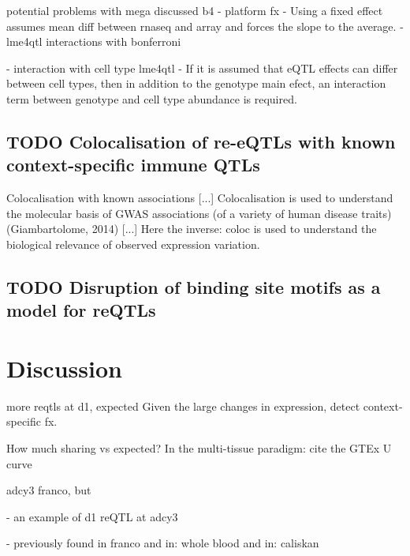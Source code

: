 potential problems with mega discussed b4
- platform fx
- Using a fixed effect assumes mean diff between rnaseq and array and forces the slope to the average.
- lme4qtl interactions with bonferroni

- interaction with cell type lme4qtl
- If it is assumed that eQTL effects can differ between cell types, then in addition to the genotype main efect, an interaction term between genotype and cell type abundance is required.


\subsection{TODO Colocalisation of re-eQTLs with known context-specific immune QTLs}

Colocalisation with known associations [...]
Colocalisation is used to understand the molecular basis of GWAS associations (of a variety of human disease traits) (Giambartolome, 2014) [...]
Here the inverse: coloc is used to understand the biological relevance of observed expression variation.

\subsection{TODO Disruption of binding site motifs as a model for reQTLs}

\section{Discussion}

more reqtls at d1, expected
Given the large changes in expression, detect context-specific fx.




How much sharing vs expected?
In the multi-tissue paradigm: cite the GTEx U curve

adcy3
franco, but

- an example of d1 reQTL at adcy3

- previously found in franco
and in:
whole blood
and in: 
caliskan

